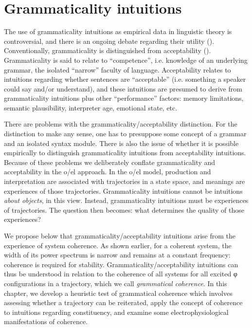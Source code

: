 \chapter{Grammaticality intuitions}

The use of grammaticality intuitions as empirical data in linguistic theory is controversial, and there is an ongoing debate regarding their utility (\citealt{CulicoverJackendoff2010,FFerreira2005,GibsonFedorenko2010,GibsonFedorenko2013,SprouseAlmeida2013}). Conventionally, grammaticality is distinguished from acceptability (\citealt{Schütze2016,Sprouse2007}). Grammaticality is said to relate to “competence”, i.e. knowledge of an underlying grammar, the isolated “narrow” faculty of language. Acceptability relates to intuitions regarding whether sentences are “acceptable” (i.e. something a speaker could say and/or understand), and these intuitions are presumed to derive from grammaticality intuitions plus other “performance” factors: memory limitations, semantic plausibility, interpreter age, emotional state, etc. 

  There are problems with the grammaticality/acceptability distinction. For the distinction to make any sense, one has to presuppose some concept of a grammar and an isolated syntax module. There is also the issue of whether it is possible empirically to distinguish grammaticality intuitions from acceptability intuitions. Because of these problems we deliberately conflate grammaticality and acceptability in the o/el approach. In the o/el model, production and interpretation are associated with trajectories in a state space, and meanings are experiences of those trajectories. Grammaticality intuitions cannot be intuitions \textit{about objects}, in this view. Instead, grammaticality intuitions must be experiences of trajectories. The question then becomes: what determines the quality of those experiences? 

  We propose below that grammaticality/acceptability intuitions arise from the experience of system coherence. As shown earlier, for a coherent system, the width of its power spectrum is narrow and remains at a constant frequency: coherence is required for stability. Grammaticality/acceptability intuitions can thus be understood in relation to the coherence of all systems for all excited φ configurations in a trajectory, which we call \textit{grammatical coherence}. In this chapter, we develop a heuristic test of grammatical coherence which involves assessing whether a trajectory can be reiterated, apply the concept of coherence to intuitions regarding constituency, and examine some electrophysiological manifestations of coherence. 


